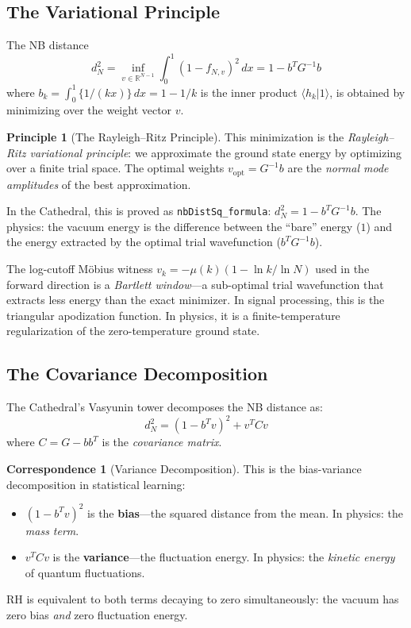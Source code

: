 \documentclass[11pt,a4paper]{article}
\theoremstyle{definition}
\newtheorem{principle}[definition]{Principle}
\newtheorem{correspondence}[definition]{Correspondence}
\newcommand{\RR}{\mathbb{R}}
\newcommand{\fract}[1]{\{#1\}}
\newcommand{\lean}[1]{\texttt{#1}}
\newcommand{\braket}[2]{\langle #1 | #2 \rangle}
\begin{document}
\subsection{The Variational Principle}

The NB distance
\[
  d_N^2 = \inf_{v \in \RR^{N-1}} \int_0^1 (1 - f_{N,v})^2\,dx
  = 1 - b^T G^{-1} b
\]
where $b_k = \int_0^1 \fract{1/(kx)}\,dx = 1 - 1/k$ is the inner product
$\braket{h_k}{1}$, is obtained by minimizing over the weight vector $v$.

\begin{principle}[The Rayleigh--Ritz Principle]
This minimization is the \emph{Rayleigh--Ritz variational principle}:
we approximate the ground state energy by optimizing over a finite
trial space. The optimal weights $v_{\mathrm{opt}} = G^{-1}b$ are the
\emph{normal mode amplitudes} of the best approximation.

In the Cathedral, this is proved as \lean{nbDistSq\_formula}:
$d_N^2 = 1 - b^T G^{-1} b$. The physics: the vacuum energy is the
difference between the ``bare'' energy ($1$) and the energy extracted
by the optimal trial wavefunction ($b^T G^{-1} b$).
\end{principle}

The log-cutoff M\"obius witness $v_k = -\mu(k)(1 - \ln k / \ln N)$ used
in the forward direction is a \emph{Bartlett window}---a sub-optimal
trial wavefunction that extracts less energy than the exact minimizer.
In signal processing, this is the triangular apodization function.
In physics, it is a finite-temperature regularization of the
zero-temperature ground state.

\subsection{The Covariance Decomposition}

The Cathedral's Vasyunin tower decomposes the NB distance as:
\[
  d_N^2 = (1 - b^T v)^2 + v^T C v
\]
where $C = G - b b^T$ is the \emph{covariance matrix}.

\begin{correspondence}[Variance Decomposition]
This is the bias-variance decomposition in statistical learning:
\begin{itemize}
  \item $(1 - b^T v)^2$ is the \textbf{bias}---the squared distance
    from the mean. In physics: the \emph{mass term}.
  \item $v^T C v$ is the \textbf{variance}---the fluctuation energy.
    In physics: the \emph{kinetic energy} of quantum fluctuations.
\end{itemize}
RH is equivalent to both terms decaying to zero simultaneously:
the vacuum has zero bias \emph{and} zero fluctuation energy.
\end{correspondence}
\end{document}
